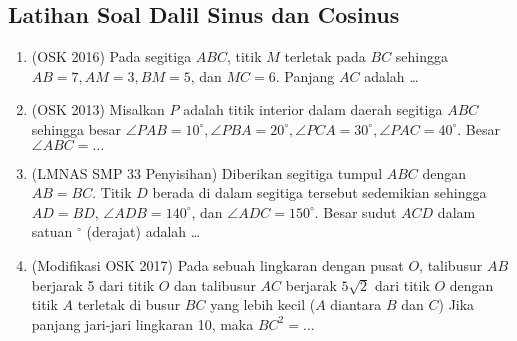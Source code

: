 \subsection{Latihan Soal Dalil Sinus dan Cosinus}
\begin{enumerate}
    \item (OSK 2016) Pada segitiga $ABC$, titik $M$ terletak pada $BC$ sehingga $AB=7, AM=3, BM=5$, dan $MC=6$. Panjang $AC$ adalah \dots

    \item (OSK 2013) Misalkan $P$ adalah titik interior dalam daerah segitiga $ABC$ sehingga besar $\angle PAB = 10^\circ, \angle PBA = 20^\circ, \angle PCA = 30^\circ, \angle PAC=40^\circ$. Besar $\angle ABC = \dots$
    
    \item (LMNAS SMP 33 Penyisihan) Diberikan segitiga tumpul $ABC$ dengan $AB = BC$. Titik $D$ berada di dalam segitiga tersebut sedemikian sehingga $AD = BD$, $\angle ADB = 140^\circ$, dan $\angle ADC = 150^\circ$. Besar sudut $ACD$ dalam satuan $^\circ$ (derajat) adalah \dots
    
    \item (Modifikasi OSK 2017) Pada sebuah lingkaran dengan pusat $O$, talibusur $AB$ berjarak 5 dari titik $O$ dan talibusur $AC$ berjarak $5\sqrt{2}$ dari titik $O$ dengan titik $A$ terletak di busur $BC$ yang lebih kecil ($A$ diantara $B$ dan $C$) Jika panjang jari-jari lingkaran 10, maka $BC^2=\dots$
\end{enumerate}